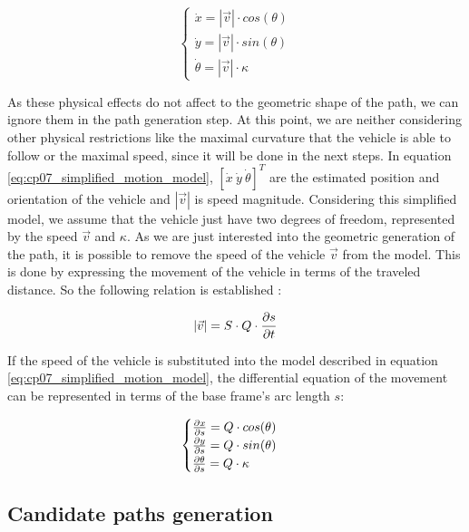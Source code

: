 \begin{equation}\label{eq:cp07_simplified_motion_model}
\begin{cases}
\dot{x} = |\vec{v}| \cdot cos(\theta) \\
\dot{y} = |\vec{v}| \cdot sin(\theta) \\
\dot{\theta} = |\vec{v}| \cdot \kappa
\end{cases}
\end{equation}

As these physical effects do not affect to the geometric shape of the path, we can ignore them in the path generation step. At this point, we are neither considering other physical restrictions like the maximal curvature that the vehicle is able to follow or the maximal speed, since it will be done in the next steps. In equation \ref{eq:cp07_simplified_motion_model}, $[\dot{x} ~ \dot{y} ~ \dot{\theta} ]^T$ are the estimated position and orientation of the vehicle and $|\vec{v}|$ is speed magnitude. Considering this simplified model, we assume that the vehicle just have two degrees of freedom, represented by the speed $\vec{v}$ and $\kappa$. As we are just interested into the geometric generation of the path, it is possible to remove the speed of the vehicle $\vec{v}$ from the model. This is done by expressing the movement of the vehicle in terms of the traveled distance. So the following relation is established \citep{chu2012local}:

\begin{equation}\label{eq:cp07_speed_to_distance}
|\vec{v}| = S \cdot Q \cdot { {\partial s} \over {\partial t}}
\end{equation}

If the speed of the vehicle is substituted into the model described in equation \ref{eq:cp07_simplified_motion_model}, the differential equation of the movement can be represented in terms of the base frame's arc length $s$:

\begin{equation}\label{eq:cp07_motion_model_in_distance_terms}
\begin{cases}
{{\partial x} \over {\partial s}} = Q \cdot cos(\theta) \\
{{\partial y} \over {\partial s}} = Q \cdot sin(\theta) \\
{{\partial \theta} \over {\partial s}} = Q \cdot \kappa
\end{cases}
\end{equation}

\subsection{Candidate paths generation}\label{ch:chapter07_01_03}

